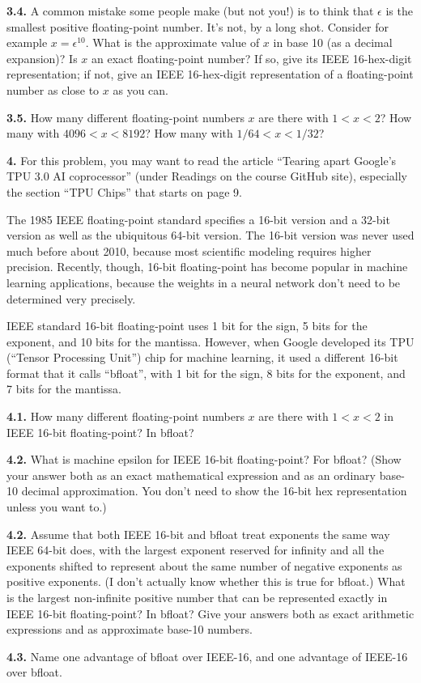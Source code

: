 \documentclass[11pt]{article}
\begin{document}
\par\medskip
{\bf 3.4.}
A common mistake some people make (but not you!) is to think that $\epsilon$ is
the smallest positive floating-point number. 
It's not, by a long shot. 
Consider for example $x = \epsilon^{10}$. 
What is the approximate value of $x$ in base 10 (as a decimal expansion)?
Is $x$ an exact floating-point number? 
If so, give its IEEE 16-hex-digit representation;
if not, give an IEEE 16-hex-digit representation of a floating-point number as
close to $x$ as you can.

\par\medskip 
{\bf 3.5.}
How many different floating-point numbers $x$ are there with $1 < x < 2$?
How many with $4096 < x < 8192$?  How many with $1/64 < x < 1/32$?


\par\bigskip
{\bf 4.}
For this problem, you may want to read the article 
``Tearing apart Google's TPU 3.0 AI coprocessor'' 
(under Readings on the course GitHub site),
especially the section ``TPU Chips'' that starts on page 9.

The 1985 IEEE floating-point standard specifies a 16-bit version 
and a 32-bit version as well as the ubiquitous 64-bit version.
The 16-bit version was never used much before about 2010,
because most scientific modeling requires higher precision. 
Recently, though, 
16-bit floating-point has become popular in machine learning applications,
because the weights in a neural network don't need to be determined very precisely.

IEEE standard 16-bit floating-point uses 1 bit for the sign, 5 bits for 
the exponent, and 10 bits for the mantissa. 
However, when Google developed its TPU (``Tensor Processing Unit'') chip
for machine learning, it used a different 16-bit format that it calls
``bfloat'', with 1 bit for the sign, 8 bits for the exponent, and 7 bits for the mantissa.

\par\medskip
{\bf 4.1.}
How many different floating-point numbers $x$ are there with $1 < x < 2$
in IEEE 16-bit floating-point? In bfloat?

\par\medskip
{\bf 4.2.}
What is machine epsilon for IEEE 16-bit floating-point? For bfloat?
(Show your answer both as an exact mathematical expression and as an ordinary base-10
decimal approximation. 
You don't need to show the 16-bit hex representation unless you want to.)

\par\medskip
{\bf 4.2.}
Assume that both IEEE 16-bit and bfloat treat exponents the same way IEEE 64-bit
does, with the largest exponent reserved for infinity and all the exponents
shifted to represent about the same number of negative exponents as positive
exponents. (I don't actually know whether this is true for bfloat.)
What is the largest non-infinite positive number that can be represented exactly
in IEEE 16-bit floating-point? In bfloat? Give your answers both as exact
arithmetic expressions and as approximate base-10 numbers.

\par\medskip
{\bf 4.3.}
Name one advantage of bfloat over IEEE-16, 
and one advantage of IEEE-16 over bfloat.
\end{document}
